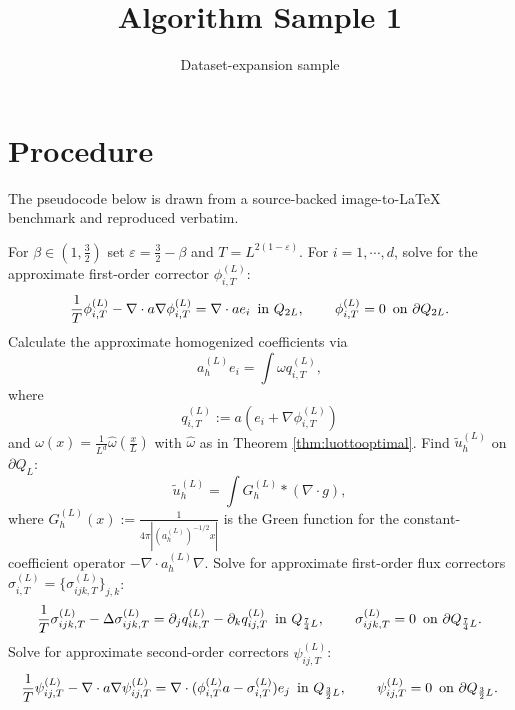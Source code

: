 \documentclass[11pt]{article}
\title{Algorithm Sample 1}
\author{Dataset-expansion sample}
\date{}
\begin{document}
\maketitle
\section{Procedure}
The pseudocode below is drawn from a source-backed image-to-LaTeX benchmark and reproduced verbatim.

\begin{algorithmic}
[1]
\State For $\beta\in (1,\frac{3}{2})$ set $\varepsilon = \frac{3}{2}-\beta$ and $T = L^{2(1-\varepsilon)}$. For $i=1,\cdots,d$, solve for the approximate first-order corrector $\phi_{i,T}^{(L)}$:
\begin{equation*}
\dfrac{1}{T}\phi_{i,T}^{(L)}-\nabla \cdot a \nabla \phi_{i,T}^{(L)} =\nabla\cdot ae_i \, \mbox{ in }Q_{2L}, \hspace{0.3in} \phi_{i,T}^{(L)}=0 \, \mbox{ on }\partial Q_{2L}.
\end{equation*}
\State Calculate the approximate homogenized coefficients via \begin{equation*}
a_h^{(L)}e_i=\int \omega q_{i,T}^{(L)},
\end{equation*} where \begin{equation*}
q_{i,T}^{(L)}:=a(e_i+\nabla\phi_{i,T}^{(L)})\end{equation*} and $\omega(x)=\frac{1}{L^d}\hat{\omega}(\frac{x}{L})$ with $\hat{\omega}$ as in Theorem \ref{thm:luottooptimal}.
\State Find $\tilde{u}_h^{(L)}$ on $\partial Q_L$:
\begin{equation*}
\tilde{u}_h^{(L)} =\int G_h^{(L)}* (\nabla\cdot g),
\end{equation*}where $G_h^{(L)}(x) := \frac{1}{4\pi\left|(a_h^{(L)})^{-1/2}x\right|}$ is the Green function for the constant-coefficient operator $-\nabla\cdot a_h^{(L)} \nabla$.
\State Solve for approximate first-order flux correctors $\sigma_{i,T}^{(L)}=\{\sigma_{ijk,T}^{(L)}\}_{j,k}$: \begin{equation*}
\dfrac{1}{T}\sigma_{ijk,T}^{(L)}-\Delta \sigma_{ijk,T}^{(L)} =\partial_j q_{ik,T}^{(L)}-\partial_k q_{ij,T}^{(L)} \, \mbox{ in }Q_{\frac{7}{4}L}, \hspace{0.3in} \sigma_{ijk,T}^{(L)}=0 \, \mbox{ on }\partial Q_{\frac{7}{4}L}.
\end{equation*}
\State Solve for approximate second-order correctors $\psi_{ij,T}^{(L)}$: \begin{equation*}
\dfrac{1}{T}\psi_{ij,T}^{(L)} - \nabla\cdot a \nabla \psi_{ij,T}^{(L)} = \nabla\cdot (\phi_{i,T}^{(L)}a-\sigma_{i,T}^{(L)})e_j \, \mbox{ in }Q_{\frac{3}{2}L}, \hspace{0.3in} \psi_{ij,T}^{(L)}=0 \,\mbox{ on }\partial Q_{\frac{3}{2}L}.

\end{equation*}
\end{algorithmic}
\end{document}
